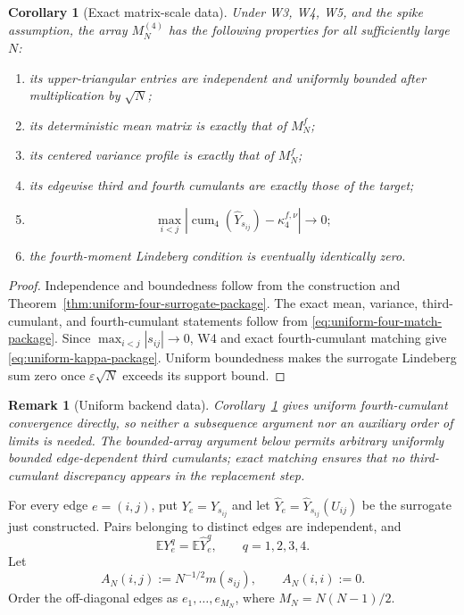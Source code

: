\documentclass[10pt,a4paper]{amsart}
\newtheorem{corollary}[theorem]{Corollary}
\newtheorem{remark}[theorem]{Remark}
\newcommand{\E}{\mathbb E}
\newcommand{\cum}{\operatorname{cum}}
\begin{document}
\begin{corollary}[Exact matrix-scale data]
\label{cor:atomic-array-data-package}
Under W3, W4, W5, and the spike assumption, the array
\(M_N^{(4)}\) has the following properties for all sufficiently large \(N\):
\begin{enumerate}[label=(A\arabic*)]
\item its upper-triangular entries are independent and uniformly bounded after
      multiplication by \(\sqrt N\);
\item its deterministic mean matrix is exactly that of \(M_N^f\);
\item its centered variance profile is exactly that of \(M_N^f\);
\item its edgewise third and fourth cumulants are exactly those of the target;
\item
\begin{equation}\label{eq:uniform-kappa-package}
 \max_{i<j}
 \left|
 \cum_4(\widehat Y_{s_{ij}})-\kappa_4^{f,\nu}
 \right|\longrightarrow0;
\end{equation}
\item the fourth-moment Lindeberg condition is eventually identically zero.
\end{enumerate}
\end{corollary}

\begin{proof}
Independence and boundedness follow from the construction and
Theorem~\ref{thm:uniform-four-surrogate-package}.  The exact mean, variance,
third-cumulant, and fourth-cumulant statements follow from
\eqref{eq:uniform-four-match-package}.  Since
\(\max_{i<j}|s_{ij}|\to0\), W4 and exact fourth-cumulant matching give
\eqref{eq:uniform-kappa-package}.  Uniform boundedness makes the surrogate
Lindeberg sum zero once \(\varepsilon\sqrt N\) exceeds its support bound.
\end{proof}

\begin{remark}[Uniform backend data]
Corollary~\ref{cor:atomic-array-data-package} gives uniform fourth-cumulant
convergence directly, so neither a subsequence argument nor an auxiliary
order of limits is needed.  The bounded-array argument below permits arbitrary
uniformly bounded edge-dependent third cumulants; exact matching ensures that
no third-cumulant discrepancy appears in the replacement step.
\end{remark}

For every edge $e=(i,j)$, put $Y_e=Y_{s_{ij}}$ and let
$\widehat Y_e=\widehat Y_{s_{ij}}(U_{ij})$ be the surrogate just constructed.
Pairs belonging to distinct edges are independent, and
\begin{equation}\label{eq:edge-four-match-package}
 \E Y_e^q=\E\widehat Y_e^q,
 \qquad q=1,2,3,4.
\end{equation}
Let
\begin{equation}\label{eq:mean-matrix-package}
 A_N(i,j):=N^{-1/2}m(s_{ij}),
 \qquad A_N(i,i):=0.
\end{equation}
Order the off-diagonal edges as $e_1,\ldots,e_{M_N}$, where
$M_N=N(N-1)/2$.
\end{document}

